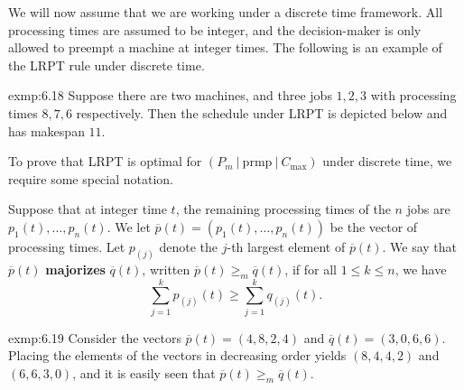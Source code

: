 We will now assume that we are working under a discrete time framework. 
All processing times are assumed to be integer, and the decision-maker 
is only allowed to preempt a machine at integer times. 
The following is an example of the LRPT rule under discrete time. 

\begin{exmp}{exmp:6.18}
    Suppose there are two machines, and three jobs $1, 2, 3$ with processing 
    times $8, 7, 6$ respectively. Then the schedule under LRPT is depicted 
    below and has makespan $11$. 
    \begin{center} 
    \end{center}
\end{exmp}

To prove that LRPT is optimal for $(P_m~|~\text{prmp}~|~C_{\max})$ under 
discrete time, we require some special notation. 

Suppose that at integer time $t$, the remaining processing times of the 
$n$ jobs are $p_1(t), \dots, p_n(t)$. We let $\overline p(t) = 
(p_1(t), \dots, p_n(t))$ be the vector of processing times. Let 
$p_{(j)}$ denote the $j$-th largest element of $\overline p(t)$. We say that 
$\overline p(t)$ {\bf majorizes} $\overline q(t)$, written $\overline p(t) \geq_m 
\overline q(t)$, if for all $1 \leq k \leq n$, we have 
\[ \sum_{j=1}^k p_{(j)}(t) \geq \sum_{j=1}^k q_{(j)}(t). \] 

\begin{exmp}{exmp:6.19}
    Consider the vectors $\overline p(t) = (4, 8, 2, 4)$ and $\overline q(t) = 
    (3, 0, 6, 6)$. Placing the elements of the vectors in decreasing order 
    yields $(8, 4, 4, 2)$ and $(6, 6, 3, 0)$, and it is easily seen that 
    $\overline p(t) \geq_m \overline q(t)$. 
\end{exmp}

